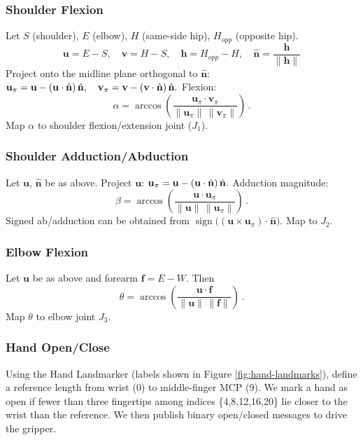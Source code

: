 \documentclass[manuscript,screen]{acmart} %
\begin{document}
\subsubsection{Shoulder Flexion}
Let $S$ (shoulder), $E$ (elbow), $H$ (same-side hip), $H_{opp}$ (opposite hip).
\begin{displaymath}
  \mathbf{u}=E-S,\quad \mathbf{v}=H-S,\quad \mathbf{h}=H_{opp}-H,\quad \hat{\mathbf{n}}=\frac{\mathbf{h}}{\lVert\mathbf{h}\rVert}
\end{displaymath}
Project onto the midline plane orthogonal to $\hat{\mathbf{n}}$:
$
\mathbf{u}_\pi=\mathbf{u}-(\mathbf{u}\cdot\hat{\mathbf{n}})\,\hat{\mathbf{n}},\quad
\mathbf{v}_\pi=\mathbf{v}-(\mathbf{v}\cdot\hat{\mathbf{n}})\,\hat{\mathbf{n}}. \\
$
Flexion:
\begin{equation}
\alpha=\arccos \!\left( \frac{\mathbf{u}_\pi \cdot \mathbf{v}_\pi}{\lVert\mathbf{u}_\pi\rVert\, \lVert\mathbf{v}_\pi\rVert} \right)\,.
\end{equation}
Map $\alpha$ to shoulder flexion/extension joint ($J_1$).

\subsubsection{Shoulder Adduction/Abduction}
Let $\mathbf{u}$, $\hat{\mathbf{n}}$ be as above. Project $\mathbf{u}$:
$
\mathbf{u}_\pi=\mathbf{u}-(\mathbf{u}\cdot\hat{\mathbf{n}})\,\hat{\mathbf{n}}.\\
$
Adduction magnitude:
\begin{equation}
\beta=\arccos \!\left( \frac{\mathbf{u}\cdot\mathbf{u}_\pi}{\lVert\mathbf{u}\rVert\, \lVert\mathbf{u}_\pi\rVert} \right)\,.
\end{equation}
Signed ab/adduction can be obtained from $\operatorname{sign}\big((\mathbf{u}\times\mathbf{u}_\pi)\cdot\hat{\mathbf{n}}\big)$. Map to $J_2$.

\subsubsection{Elbow Flexion}
Let $\mathbf{u}$ be as above and forearm $\mathbf{f}=E-W$. Then
\begin{equation}
\theta=\arccos \!\left( \frac{\mathbf{u}\cdot\mathbf{f}}{\lVert\mathbf{u}\rVert\, \lVert\mathbf{f}\rVert} \right)\,.
\end{equation}
Map $\theta$ to elbow joint $J_3$.

\subsubsection{Hand Open/Close}
Using the Hand Landmarker (labels shown in Figure \ref{fig:hand-landmarks}), 
define a reference length from wrist (0) to middle-finger MCP (9). 
We mark a hand as open if fewer than three fingertips among indices 
\{4,8,12,16,20\} lie closer to the wrist than the reference. We then 
publish binary open/closed messages to drive the gripper.
\end{document}
